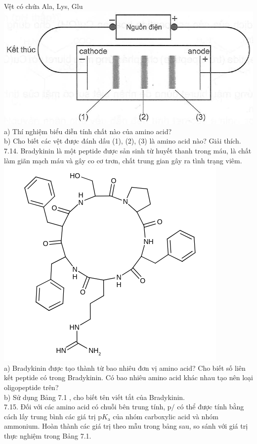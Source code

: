 \documentclass[10pt]{article}
\begin{document}
Vệt có chứa Ala, Lys, Glu\\
\includegraphics[max width=\textwidth, center]{2025_10_23_de6f5713836e4e91b3c8g-054}\\
a) Thí nghiệm biểu diễn tính chất nào của amino acid?\\
b) Cho biết các vệt được đánh dấu (1), (2), (3) là amino acid nào? Giải thích.\\
7.14. Bradykinin là một peptide được sản sinh từ huyết thanh trong máu, là chất làm giãn mạch máu và gây co cơ trơn, chất trung gian gây ra tình trạng viêm.\\
\includegraphics{smile-16abaeb78ff1340aeee728c778f79c5374c08374}\\
a) Bradykinin được tạo thành từ bao nhiêu đơn vị amino acid? Cho biết số liên kết peptide có trong Bradykinin. Có bao nhiêu amino acid khác nhau tạo nên loại oligopeptide trên?\\
b) Sử dụng Bảng 7.1 , cho biết tên viết tắt của Bradykinin.\\
7.15. Đối với các amino acid có chuỗi bên trung tính, $\mathrm{p} /$ có thể được tính bằng cách lấy trung bình các giá trị $\mathrm{p} K_{\mathrm{a}}$ của nhóm carboxylic acid và nhóm ammonium. Hoàn thành các giá trị theo mẫu trong bảng sau, so sánh với giá trị thực nghiệm trong Bảng 7.1.
\end{document}
